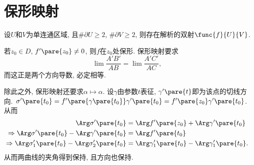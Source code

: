 \documentclass{ctexart}
\begin{document}
\section{保形映射} %
\label{sec:保形映射}

\begin{figure}[ht]
    \centering
\end{figure}
\begin{theorem}[Riemann映射定理]
    设$U$和$V$为单连通区域, 且$\# \partial U \ge 2$, $\# \partial V \ge 2$, 则存在解析的双射$\func{f}{U}{V}$.
\end{theorem}
\begin{figure}[ht]
    \centering
\end{figure}
若$z_0 \in D$, $f'\pare{z_0}\neq 0$, 则$f$在$z_0$处保形. 保形映射要求
\[ \lim \frac{A'B'}{AB} = \lim \frac{A'C'}{AC}, \]
而这正是两个方向导数, 必定相等.

\begin{figure}[ht]
    \centering
\end{figure}

除此之外, 保形映射还要求$\alpha\mapsto \alpha$. 设$\gamma$由参数$t$表征, $\gamma'\pare{t}$即为该点的切线方向. $\sigma'\pare{t_0} = f'\pare{\gamma\pare{t_0}} \gamma'\pare{t_0} = f'\pare{z_0} \gamma'\pare{t_0}$. 从而
\begin{align*}
    \Arg \sigma'\pare{t_0} &= \Arg f'\pare{z_0} + \Arg \gamma'\pare{t_0} \\
    \Rightarrow \Arg \sigma'\pare{t_0} - \Arg \gamma'\pare{t_0} &= \Arg f'\pare{t_0} \\
    \Rightarrow \Arg \sigma'_1\pare{t_0} - \Arg\sigma'_2\pare{t_0} &= \Arg\gamma'_1\pare{t_0} - \Arg \gamma'_1\pare{t_0}.
\end{align*}
从而两曲线的夹角得到保持, 且方向也保持.
\end{document}
